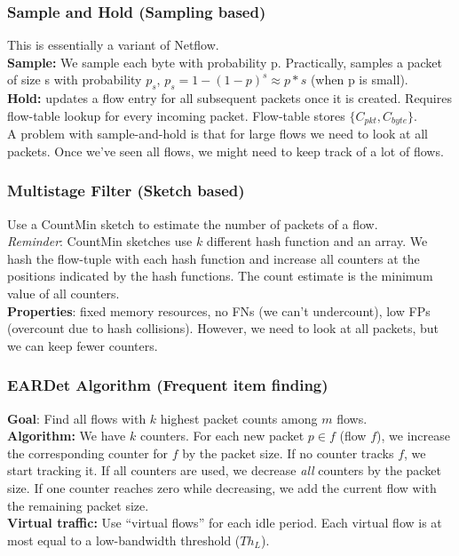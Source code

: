 \documentclass[11pt,oneside,a4paper]{article}
\begin{document}
\subsubsection{Sample and Hold (Sampling based)}

This is essentially a variant of Netflow.\\
\textbf{Sample:} We sample each byte with probability p. Practically, samples a packet of size s with probability $p_s$, $p_s = 1-(1-p)^s \approx p*s$ (when p is small).\\
\textbf{Hold:} updates a flow entry for all subsequent packets once it is created. Requires flow-table lookup for every incoming packet. Flow-table stores $\{C_{pkt}, C_{byte}\}$.\\

A problem with sample-and-hold is that for large flows we need to look at all packets. Once we've seen all flows, we might need to keep track of a lot of flows.

\subsubsection{Multistage Filter (Sketch based)}

Use a CountMin sketch to estimate the number of packets of a flow.\\
\textit{Reminder}: CountMin sketches use $k$ different hash function and an array. We hash the flow-tuple with each hash function and increase all counters at the positions indicated by the hash functions. The count estimate is the minimum value of all counters.\\
\textbf{Properties}: fixed memory resources, no FNs (we can't undercount), low FPs (overcount due to hash collisions). However, we need to look at all packets, but we can keep fewer counters.

\subsubsection{EARDet Algorithm (Frequent item finding)}

\textbf{Goal}: Find all flows with $k$ highest packet counts among $m$ flows.\\
\textbf{Algorithm:} We have $k$ counters. For each new packet $p \in f$ (flow $f$), we increase the corresponding counter for $f$ by the packet size. If no counter tracks $f$, we start tracking it. If all counters are used, we decrease \textit{all} counters by the packet size. If one counter reaches zero while decreasing, we add the current flow with the remaining packet size.\\
\textbf{Virtual traffic:} Use “virtual flows” for each idle period. Each virtual flow is at most equal to a low-bandwidth threshold ($Th_L$).\\
\end{document}
